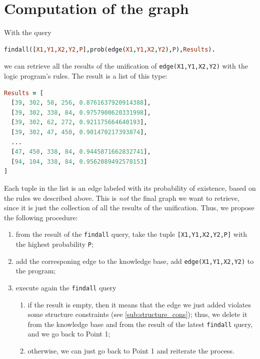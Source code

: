 \documentclass[8pt]{article}
\begin{document}
\section{Computation of the graph}
\label{sec:computation_graph}
With the query 
  \begin{center}
  \begin{lstlisting}[language=Prolog,frame = single,basicstyle=\footnotesize\ttfamily]
findall([X1,Y1,X2,Y2,P],prob(edge(X1,Y1,X2,Y2),P),Results).
  \end{lstlisting}
  \end{center}
we can retrieve all the results of the unification of \texttt{edge(X1,Y1,X2,Y2)}
with the logic program's rules. The result is a list of this type:
  \begin{center}
  \begin{lstlisting}[language=Prolog,frame = single,basicstyle=\footnotesize\ttfamily]
Results = [
  [39, 302, 58, 256, 0.8761637920914388],
  [39, 302, 338, 84, 0.9757900620331998],
  [39, 302, 62, 272, 0.921175664640193],
  [39, 302, 47, 450, 0.901470217393874],
  ...
  [47, 450, 338, 84, 0.9445871662832741],
  [94, 104, 338, 84, 0.9562089492578153]
]
  \end{lstlisting}
  \end{center}
Each tuple in the list is an edge labeled with its probability of existence,
based on the rules we described above. This is \emph{not} the final graph
we want to retrieve, since it is just the collection of all the results
of the unification. Thus, we propose the following procedure:
  \begin{enumerate}
    \item
      from the result of the \texttt{findall} query, take the tuple
      \texttt{[X1,Y1,X2,Y2,P]} with the highest probability \texttt{P};
    \item
      add the corresponing edge to the knowledge base, \ie
      add \texttt{edge(X1,Y1,X2,Y2)} to the program;
    \item
      execute again the \texttt{findall} query
      \begin{enumerate}
        \item
          if the result is empty, then it means that the edge we just
          added violates some structure constraints (see
          \cref{sub:structure_cons}); thus, we delete it from the knowledge
          base and from the result of the latest \texttt{findall} query, and we
          go back to Point 1; 
        \item
          otherwise, we can just go back to Point 1 and reiterate the process.
      \end{enumerate}
  \end{enumerate}
\end{document}
